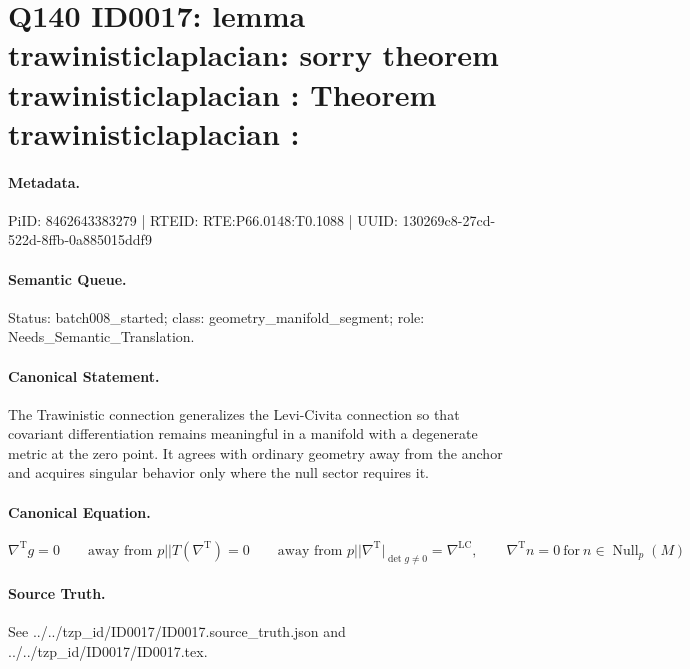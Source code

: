 \section*{Q140 ID0017: lemma trawinisticlaplacian: sorry theorem trawinisticlaplacian : Theorem trawinisticlaplacian :}
\paragraph{Metadata.}
PiID: 8462643383279 | RTEID: RTE:P66.0148:T0.1088 | UUID: 130269c8-27cd-522d-8ffb-0a885015ddf9

\paragraph{Semantic Queue.}
Status: batch008\_started; class: geometry\_manifold\_segment; role: Needs\_Semantic\_Translation.

\paragraph{Canonical Statement.}
The Trawinistic connection generalizes the Levi-Civita connection so that covariant differentiation remains meaningful in a manifold with a degenerate metric at the zero point. It agrees with ordinary geometry away from the anchor and acquires singular behavior only where the null sector requires it.

\paragraph{Canonical Equation.}
\[
\nabla^{\mathrm{T}} g = 0 \qquad \text{away from } p || T(\nabla^{\mathrm{T}})=0 \qquad \text{away from } p || \nabla^{\mathrm{T}}\big\vert_{\det g \neq 0} = \nabla^{\mathrm{LC}}, \qquad \nabla^{\mathrm{T}} n = 0 \ \text{for}\ n \in \operatorname{Null}_{p}(M)
\]

\paragraph{Source Truth.}
See ../../tzp\_id/ID0017/ID0017.source\_truth.json and ../../tzp\_id/ID0017/ID0017.tex.
